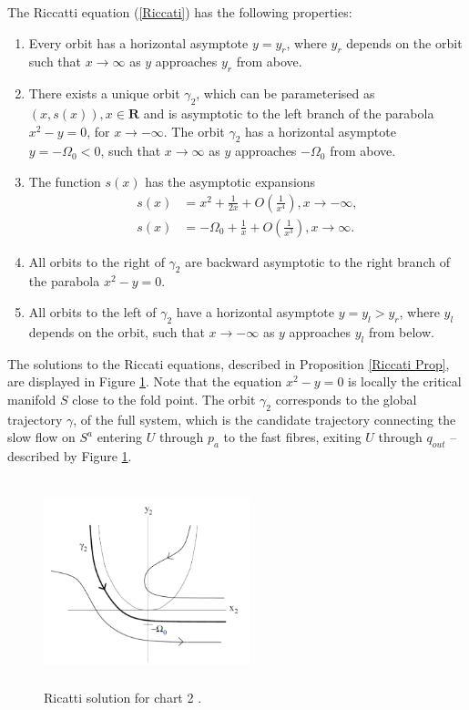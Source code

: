\begin{prop}\label{Riccati Prop} 
The Riccatti equation (\ref{Riccati}) has the following properties:
\begin{enumerate}
\item Every orbit has a horizontal asymptote $y=y_r$, where $y_r$ depends on the orbit such that $x \to \infty$ as $y$ approaches $y_r$ from above.
\item There exists a unique orbit $\gamma_2$, which can be parameterised as $(x,s(x)), x \in \mathbf{R}$ and is asymptotic to the left branch of the parabola $x^2 - y = 0$, for $x \to - \infty$. The orbit $\gamma_2$ has a horizontal asymptote $y= - \Omega_0 <0$, such that $x \to \infty$ as $y$ approaches $-\Omega_0$ from above.
\item The function $s(x)$ has the asymptotic expansions
\begin{align*}
s(x) &= x^2 + \frac{1}{2x} + O\left( \frac{1}{x^4} \right), x \to -\infty,\\
s(x) &= -\Omega_0 + \frac{1}{x} + O\left( \frac{1}{x^3} \right), x \to \infty.
\end{align*}
\item All orbits to the right of $\gamma_2$  are backward asymptotic to the right branch of the parabola $x^2-y=0$.
\item All orbits to the left of $\gamma_2$ have a horizontal asymptote $y=y_l>y_r$, where $y_l$ depends on the orbit, such that $x \to -\infty$ as $y$ approaches $y_l$ from below.
\end{enumerate}
\end{prop}

The solutions to the Riccati equations, described in Proposition \ref{Riccati Prop}, are displayed in Figure \ref{fig: Ricatti Sol}. Note that the equation $x^2 - y=0$ is locally the critical manifold $S$ close to the fold point. The orbit $\gamma_2$ corresponds to the global trajectory $\gamma$, of the full system, which is the candidate trajectory connecting the slow flow on $S^a$ entering $U$ through $p_a$ to the fast fibres, exiting $U$ through $q_{out}$ -- described by Figure \ref{fig: Ricatti Sol}. 
\begin{figure}[h!]\centering
	\includegraphics[height=6cm,width=6cm]{Images/Dynamics_in_K2}
	\caption{Ricatti solution for chart 2 \citep{krupa2001}.}
	\label{fig: Ricatti Sol}
\end{figure}
 
